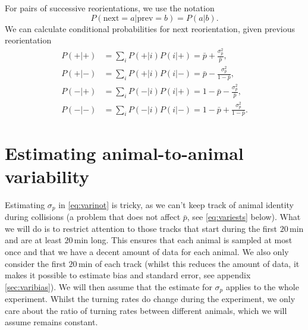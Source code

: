 \documentclass[12pt]{article}
\newcommand{\mins}[1][\,]{#1\mathrm{min}}
\begin{document}
For pairs of successive reorientations, we use the notation
%
\begin{equation}\label{eq:varipairnot}
  P(\text{next}=a|\text{prev}=b) = P(a|b) 
  .
\end{equation}
%
We can calculate conditional probabilities for next reorientation, given previous reorientation
%
\begin{equation}\label{eq:varicond}
  \begin{aligned}
    P(+|+) &= \sum_i P(+|i)P(i|+) = \bar{p} + \frac{\sigma_p^2}{\bar{p}}, \\
    P(+|-) &= \sum_i P(+|i)P(i|-) = \bar{p} - \frac{\sigma_p^2}{1-\bar{p}}, \\
    P(-|+) &= \sum_i P(-|i)P(i|+) = 1-\bar{p} - \frac{\sigma_p^2}{\bar{p}}, \\
    P(-|-) &= \sum_i P(-|i)P(i|-) =1- \bar{p} + \frac{\sigma_p^2}{1-\bar{p}}.
  \end{aligned}
\end{equation}
%

\section{Estimating animal-to-animal variability}\label{sec:variest}

Estimating $\sigma_p$ in \eqref{eq:varinot} is tricky, as we can't keep track of animal identity during collisions (a problem that does not affect $\bar{p}$, see \eqref{eq:variests} below). What we will do is to restrict attention to those tracks that start during the first $20\mins$ and are at least $20\mins$ long. This ensures that each animal is sampled at most once and that we have a decent amount of data for each animal. We also only consider the first $20\mins$ of each track (whilst this reduces the amount of data, it makes it possible to estimate bias and standard error, see appendix \ref{sec:varibias}). We will then assume that the estimate for $\sigma_p$ applies to the whole experiment. Whilst the turning rates do change during the experiment, we only care about the ratio of turning rates between different animals, which we will assume remains constant.
\end{document}
